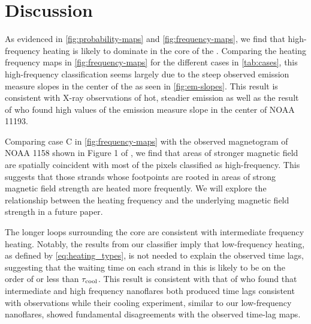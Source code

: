 \section{Discussion}\label{sec:discussion}

As evidenced in \autoref{fig:probability-maps} and \autoref{fig:frequency-maps}, we find that high-frequency heating is likely to dominate in the core of the \AR. 
Comparing the heating frequency maps in \autoref{fig:frequency-maps} for the different cases in \autoref{tab:cases}, this high-frequency classification seems largely due to the steep observed emission measure slopes in the center of the \AR{} as seen in \autoref{fig:em-slopes}.
This result is consistent with X-ray observations of hot, steadier emission \citep{warren_evidence_2010,warren_constraints_2011,winebarger_using_2011} as well as the result of \citet{del_zanna_evolution_2015} who found high values of the emission measure slope in the center of NOAA 11193.

Comparing case C in \autoref{fig:frequency-maps} with the observed magnetogram of NOAA 1158 shown in Figure 1 of , we find that areas of stronger magnetic field are spatially coincident with most of the pixels classified as high-frequency.
This suggests that those strands whose footpoints are rooted in areas of strong magnetic field strength are heated more frequently.
We will explore the relationship between the heating frequency and the underlying magnetic field strength in a future paper.

The longer loops surrounding the core are consistent with intermediate frequency heating.
Notably, the results from our classifier imply that low-frequency heating, as defined by \autoref{eq:heating_types}, is not needed to explain the observed time lags, suggesting that the waiting time on each strand in this \AR{} is likely to be on the order of or less than $\tau_\textup{cool}$.
This result is consistent with that of \citet{bradshaw_patterns_2016} who found that intermediate and high frequency nanoflares both produced time lags consistent with observations while their cooling experiment, similar to our low-frequency nanoflares, showed fundamental disagreements with the observed time-lag maps.


